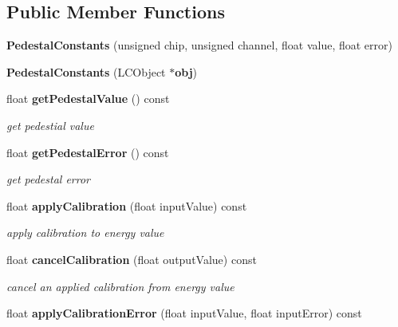 \subsection*{Public Member Functions}
\begin{DoxyCompactItemize}
\item 
{\bfseries Pedestal\-Constants} (unsigned chip, unsigned channel, float value, float error)\label{classCALICE_1_1PedestalConstants_ae24d817e0c641d205edc72170c76768f}

\item 
{\bfseries Pedestal\-Constants} (L\-C\-Object $\ast${\bf obj})\label{classCALICE_1_1PedestalConstants_add3293c896cfe98d71dcd6587bd196b4}

\item 
float {\bf get\-Pedestal\-Value} () const \label{classCALICE_1_1PedestalConstants_a3c5742fc37c92c48163353c50b15458c}

\begin{DoxyCompactList}\small\item\em get pedestial value \end{DoxyCompactList}\item 
float {\bf get\-Pedestal\-Error} () const \label{classCALICE_1_1PedestalConstants_a34fe2cae3c531323401f9c63cb107167}

\begin{DoxyCompactList}\small\item\em get pedestal error \end{DoxyCompactList}\item 
float {\bf apply\-Calibration} (float input\-Value) const \label{classCALICE_1_1PedestalConstants_abbcc4190367b281e817a54467f7d7ed2}

\begin{DoxyCompactList}\small\item\em apply calibration to energy value \end{DoxyCompactList}\item 
float {\bf cancel\-Calibration} (float output\-Value) const \label{classCALICE_1_1PedestalConstants_aba93442424d99e1e2b2d1c53b36280f9}

\begin{DoxyCompactList}\small\item\em cancel an applied calibration from energy value \end{DoxyCompactList}\item 
float {\bf apply\-Calibration\-Error} (float input\-Value, float input\-Error) const \label{classCALICE_1_1PedestalConstants_ac2c94c3d42b510de4c973ffb4a463469}


\end{DoxyCompactItemize}
